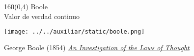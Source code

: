\documentclass[shownotes,aspectratio=169]{beamer}
\begin{document}
\begin{frame}[plain]
\begin{textblock}{160}(0,4)
 \centering \LARGE Boole \\
 \large Valor de verdad continuo
 \end{textblock}
 \vspace{1.5cm} \centering

 \texttt{[image: ../../auxiliar/static/boole.png]}

 \normalsize
 \hfill George Boole (1854) \href{https://downloads.tuxfamily.org/openmathdep/logic_ante_1900/Laws_of_Thought-Boole.pdf}{\emph{An Investigation of the Laws of Thought}}
\end{frame}

%
%
%
%
%
%
%
%
%
%
\end{document}
